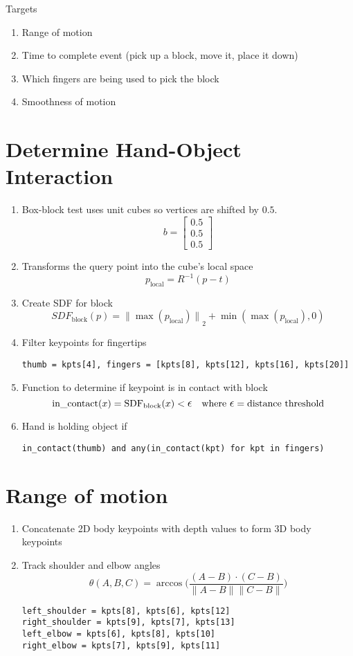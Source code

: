 \documentclass{article}
\begin{document}
Targets
\begin{enumerate}
    \item Range of motion
    \item Time to complete event (pick up a block, move it, place it down)
    \item Which fingers are being used to pick the block
    \item Smoothness of motion
\end{enumerate}

\section*{Determine Hand-Object Interaction}

\begin{enumerate}
    \item Box-block test uses unit cubes so vertices are shifted by $0.5$.
    \[b=\begin{bmatrix} 0.5 \\ 0.5 \\ 0.5 \end{bmatrix}\]
    \item Transforms the query point into the cube's local space
    \[p_\text{local}=R^{-1}(p-t)\]
    \item Create SDF for block
    \[SDF_\text{block}(p)={\|\max(p_\text{local})\|}_2 + \min(\max(p_\text{local}), 0)\]
    \item Filter keypoints for fingertips
    \begin{center}\verb|thumb = kpts[4], fingers = [kpts[8], kpts[12], kpts[16], kpts[20]]|\end{center}
    \item Function to determine if keypoint is in contact with block
    \[\text{in\_contact}(x)=\text{SDF}_\text{block}(x) < \mathlarger{\epsilon}\quad\text{where }\mathlarger{\epsilon}=\text{distance threshold}\]
    \item Hand is holding object if
    \begin{center}\verb|in_contact(thumb) and any(in_contact(kpt) for kpt in fingers)|\end{center}
\end{enumerate}

\section*{Range of motion}

\begin{enumerate}
    \item Concatenate 2D body keypoints with depth values to form 3D body keypoints
    \item Track shoulder and elbow angles
    \[\theta(A, B, C) = \arccos \Bigg(\frac{(A-B)\cdot (C-B)}{\| A-B \|\| C-B \|}\Bigg)\]
    \begin{verbatim}
left_shoulder = kpts[8], kpts[6], kpts[12]
right_shoulder = kpts[9], kpts[7], kpts[13]
left_elbow = kpts[6], kpts[8], kpts[10]
right_elbow = kpts[7], kpts[9], kpts[11]
    \end{verbatim}
\end{enumerate}
\end{document}
